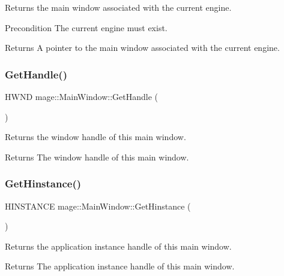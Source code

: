Returns the main window associated with the current engine.

\begin{DoxyPrecond}{Precondition}
The current engine must exist. 
\end{DoxyPrecond}
\begin{DoxyReturn}{Returns}
A pointer to the main window associated with the current engine. 
\end{DoxyReturn}
\hypertarget{classmage_1_1_main_window_ab4520f7c5ef0828535a117a8512221b5}{}\label{classmage_1_1_main_window_ab4520f7c5ef0828535a117a8512221b5} 
\subsubsection{\texorpdfstring{Get\+Handle()}{GetHandle()}}
{\footnotesize\ttfamily H\+W\+ND mage\+::\+Main\+Window\+::\+Get\+Handle (\begin{DoxyParamCaption}{ }\end{DoxyParamCaption})\hspace{0.3cm}{\ttfamily [noexcept]}}

Returns the window handle of this main window.

\begin{DoxyReturn}{Returns}
The window handle of this main window. 
\end{DoxyReturn}
\hypertarget{classmage_1_1_main_window_a1b8c851147ea3b51e645c2fce961fe17}{}\label{classmage_1_1_main_window_a1b8c851147ea3b51e645c2fce961fe17} 
\subsubsection{\texorpdfstring{Get\+Hinstance()}{GetHinstance()}}
{\footnotesize\ttfamily H\+I\+N\+S\+T\+A\+N\+CE mage\+::\+Main\+Window\+::\+Get\+Hinstance (\begin{DoxyParamCaption}{ }\end{DoxyParamCaption})\hspace{0.3cm}{\ttfamily [noexcept]}}

Returns the application instance handle of this main window.

\begin{DoxyReturn}{Returns}
The application instance handle of this main window. 
\end{DoxyReturn}
\hypertarget{classmage_1_1_main_window_a16ea3780659e00c8e4732b518c7c4a1e}{}\label{classmage_1_1_main_window_a16ea3780659e00c8e4732b518c7c4a1e} 
